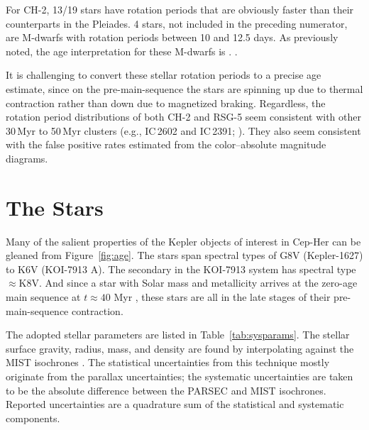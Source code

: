 \documentclass[12pt,twocolumn,tighten,linenumbers,trackchanges]{aastex63}
\begin{document}
For CH-2, 13/19 stars have rotation periods that are obviously faster
than their counterparts in the Pleiades.  4 stars, not included
in the preceding numerator, are M-dwarfs with rotation periods between
10 and 12.5 days.  As previously noted, the age interpretation for
these M-dwarfs is .  .

It is challenging to convert these stellar rotation periods to a
precise age estimate, since on the pre-main-sequence the stars are
spinning up due to thermal contraction rather than down due to
magnetized braking.  Regardless, the rotation period distributions of
both CH-2 and RSG-5 seem consistent with other 30\,Myr to 50\,Myr
clusters ({e.g.}, IC\,2602 and IC\,2391;
\citealt{douglas_stephanie_t_2021_5131306}).  They also seem
consistent with the false positive rates estimated from the
color--absolute magnitude diagrams.


\section{The Stars}
\label{sec:stars}



Many of the salient properties of the Kepler objects of interest in Cep-Her can be
gleaned from Figure~\ref{fig:age}.  The stars span spectral types of
G8V (Kepler-1627) to K6V (KOI-7913 A).  The secondary in the KOI-7913
system has spectral type $\approx$K8V.  And since a star with
Solar mass and metallicity arrives at the zero-age main sequence at
$t\approx40$ Myr \citep{choi_mesa_2016}, these stars are all in the
late stages of their pre-main-sequence contraction.  

The adopted stellar parameters are listed in
Table~\ref{tab:sysparams}.  The stellar surface gravity, radius, mass,
and density are found by interpolating against the MIST isochrones
\citep{choi_mesa_2016}.  The statistical uncertainties from this
technique mostly originate from the parallax uncertainties; the
systematic uncertainties are taken to be the absolute difference
between the PARSEC \citep{bressan_parsec_2012} and MIST isochrones.
Reported uncertainties are a quadrature sum of the statistical and
systematic components. 
\end{document}
